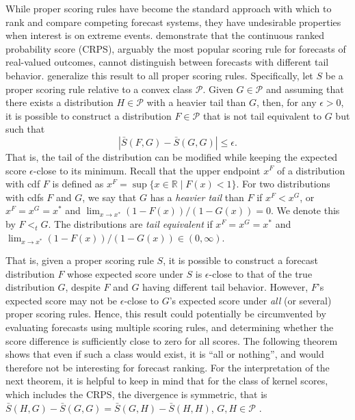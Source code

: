 \documentclass[12pt]{article}
\newcommand{\R}{\mathbb{R}}
\newcommand{\Pp}{\mathcal{P}}
\newcommand{\1}{\mathbf{1}} %
\theoremstyle{definition}
\begin{document}
While proper scoring rules have become the standard approach with which to rank and compare competing forecast systems, they have undesirable properties when interest is on extreme events. \cite{TaillardatEtAl2023} demonstrate that the continuous ranked probability score (CRPS), arguably the most popular scoring rule for forecasts of real-valued outcomes, cannot distinguish between forecasts with different tail behavior. \cite{BrehmerStrokorb2019} generalize this result to all proper scoring rules. Specifically, let $S$ be a proper scoring rule relative to a convex class $\Pp$. Given $G \in \Pp$ and assuming that there exists a distribution $H \in \Pp$ with a heavier tail than $G$, then, for any $\epsilon > 0$, it is possible to construct a distribution $F \in \Pp$ that is not tail equivalent to $G$ but such that
\begin{equation*}
	\left| \bar{S}(F, G) - \bar{S}(G, G) \right| \leq \epsilon.
\end{equation*}
That is, the tail of the distribution can be modified while keeping the expected score $\epsilon$-close to its minimum. Recall that the upper endpoint $x^F$ of a distribution with cdf $F$ is defined as $x^F = \sup\{x \in \R \mid F(x) < 1\}$. For two distributions with cdfs $F$ and $G$, we say that $G$ has a \emph{heavier tail} than $F$ if $x^F < x^G$, or $x^F = x^G = x^*$ and $\lim_{x \to x^*}(1 - F(x))/(1-G(x)) = 0$. We denote this by $F <_t G$. The distributions are \emph{tail equivalent} if $x^F = x^G = x^*$ and $\lim_{x \to x^*}(1 - F(x))/(1-G(x)) \in (0,\infty)$.

That is, given a proper scoring rule $S$, it is possible to construct a forecast distribution $F$ whose expected score under $S$ is $\epsilon$-close to that of the true distribution $G$, despite $F$ and $G$ having different tail behavior. However, $F$'s expected score may not be $\epsilon$-close to $G$'s expected score under \emph{all} (or several) proper scoring rules. Hence, this result could potentially be circumvented by evaluating forecasts using multiple scoring rules, and determining whether the score difference is sufficiently close to zero for all scores. The following theorem shows that even if such a class would exist, it is ``all or nothing'', and would therefore not be interesting for forecast ranking. For the interpretation of the next theorem, it is helpful to keep in mind that for the class of kernel scores, which includes the CRPS, the divergence is symmetric, that is $\bar{S}(H,G) - \bar{S}(G,G) = \bar{S}(G,H) - \bar{S}(H,H)$, $G,H \in \Pp$ \citep[Section 5.1]{GneitingRaftery2007}. 
\end{document}
